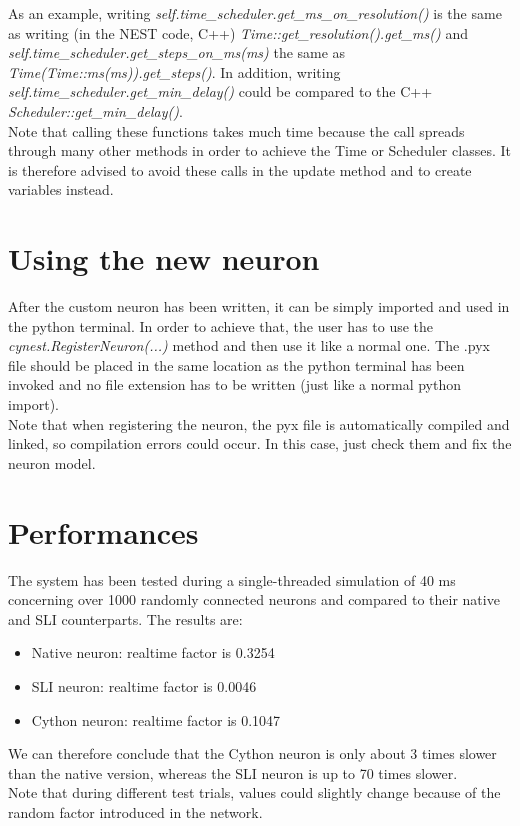 \documentclass{article}
\begin{document}
As an example, writing \emph{self.time\_scheduler.get\_ms\_on\_resolution()} is the same as writing (in the NEST code, C++) \emph{Time::get\_resolution().get\_ms()} and \emph{self.time\_scheduler.get\_steps\_on\_ms(ms)} the same as \emph{Time(Time::ms(ms)).get\_steps()}. In addition, writing \emph{self.time\_scheduler.get\_min\_delay()} could be compared to the C++ \emph{Scheduler::get\_min\_delay()}.\\
Note that calling these functions takes much time because the call spreads through many other methods in order to achieve the Time or Scheduler classes. It is therefore advised to avoid these calls in the update method and to create variables instead.

\section{Using the new neuron}
After the custom neuron has been written, it can be simply imported and used in the python terminal. In order to achieve that, the user has to use the \emph{cynest.RegisterNeuron(...)} method and then use it like a normal one. The .pyx file should be placed in the same location as the python terminal has been invoked and no file extension has to be written (just like a normal python import).\\
Note that when registering the neuron, the pyx file is automatically compiled and linked, so compilation errors could occur. In this case, just check them and fix the neuron model.

\section{Performances}
The system has been tested during a single-threaded simulation of 40 ms concerning over 1000 randomly connected neurons and compared to their native and SLI counterparts. The results are:
\begin{itemize}
\item Native neuron: realtime factor is 0.3254
\item SLI neuron: realtime factor is 0.0046
\item Cython neuron: realtime factor is 0.1047
\end{itemize}
We can therefore conclude that the Cython neuron is only about 3 times slower than the native version, whereas the SLI neuron is up to 70 times slower.\\
Note that during different test trials, values could slightly change because of the random factor introduced in the network.\\
\end{document}
